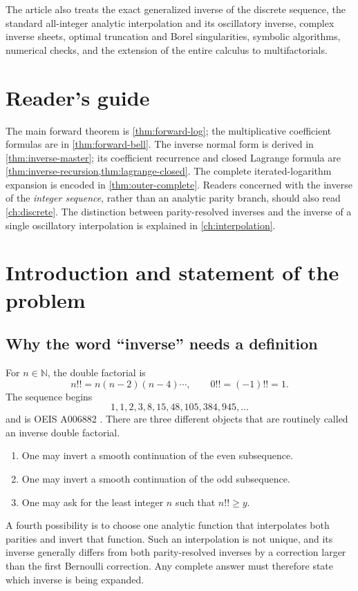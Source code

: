\documentclass[11pt,a4paper,oneside]{book}
\newcommand{\N}{\mathbb N}
\begin{document}
The article also treats the exact generalized inverse of the discrete sequence,
the standard all-integer analytic interpolation and its oscillatory inverse,
complex inverse sheets, optimal truncation and Borel singularities, symbolic
algorithms, numerical checks, and the extension of the entire calculus to
multifactorials.

\tableofcontents

\chapter*{Reader's guide}

The main forward theorem is \cref{thm:forward-log}; the multiplicative
coefficient formulas are in \cref{thm:forward-bell}.  The inverse normal form is
derived in \cref{thm:inverse-master}; its coefficient recurrence and closed
Lagrange formula are \cref{thm:inverse-recursion,thm:lagrange-closed}.
The complete iterated-logarithm expansion is encoded in
\cref{thm:outer-complete}.  Readers concerned with the inverse of the
\emph{integer sequence}, rather than an analytic parity branch, should also
read \cref{ch:discrete}.  The distinction between parity-resolved inverses and
the inverse of a single oscillatory interpolation is explained in
\cref{ch:interpolation}.

\mainmatter

\chapter{Introduction and statement of the problem}

\section{Why the word ``inverse'' needs a definition}

For \(n\in\N\), the double factorial is
\[
 n!!=n(n-2)(n-4)\cdots,
 \qquad 0!!=(-1)!!=1.
\]
The sequence begins
\[
 1,1,2,3,8,15,48,105,384,945,\ldots
\]
and is OEIS A006882 \cite{OEIS-A006882}.  There are three different objects that
are routinely called an inverse double factorial.

\begin{enumerate}[label=\textup{(\roman*)}]
\item One may invert a smooth continuation of the even subsequence.
\item One may invert a smooth continuation of the odd subsequence.
\item One may ask for the least integer \(n\) such that \(n!!\ge y\).
\end{enumerate}
A fourth possibility is to choose one analytic function that interpolates both
parities and invert that function.  Such an interpolation is not unique, and
its inverse generally differs from both parity-resolved inverses by a correction
larger than the first Bernoulli correction.  Any complete answer must therefore
state which inverse is being expanded.
\end{document}
